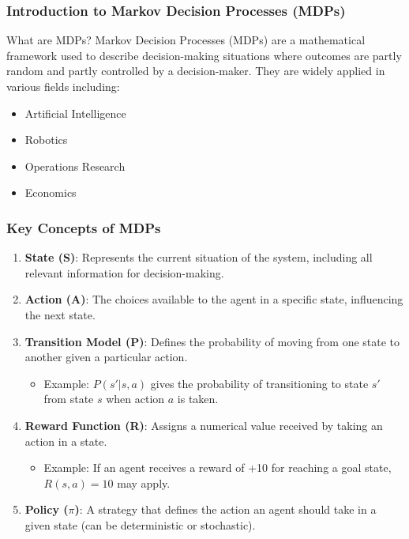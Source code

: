 \documentclass[aspectratio=169]{beamer}
\begin{document}
\frame{\titlepage}

\begin{frame}[fragile]
    \frametitle{Introduction to Markov Decision Processes (MDPs)}
    \begin{block}{What are MDPs?}
        Markov Decision Processes (MDPs) are a mathematical framework used to describe decision-making situations where outcomes are partly random and partly controlled by a decision-maker. They are widely applied in various fields including:
        \begin{itemize}
            \item Artificial Intelligence
            \item Robotics
            \item Operations Research
            \item Economics
        \end{itemize}
    \end{block}
\end{frame}

\begin{frame}[fragile]
    \frametitle{Key Concepts of MDPs}
    \begin{enumerate}
        \item \textbf{State (S)}: Represents the current situation of the system, including all relevant information for decision-making.
        \item \textbf{Action (A)}: The choices available to the agent in a specific state, influencing the next state.
        \item \textbf{Transition Model (P)}: Defines the probability of moving from one state to another given a particular action.
            \begin{itemize}
                \item Example: $P(s' | s, a)$ gives the probability of transitioning to state $s'$ from state $s$ when action $a$ is taken.
            \end{itemize}
        \item \textbf{Reward Function (R)}: Assigns a numerical value received by taking an action in a state.
            \begin{itemize}
                \item Example: If an agent receives a reward of +10 for reaching a goal state, $R(s, a) = 10$ may apply.
            \end{itemize}
        \item \textbf{Policy ($\pi$)}: A strategy that defines the action an agent should take in a given state (can be deterministic or stochastic).
    \end{enumerate}
\end{frame}
\end{document}
